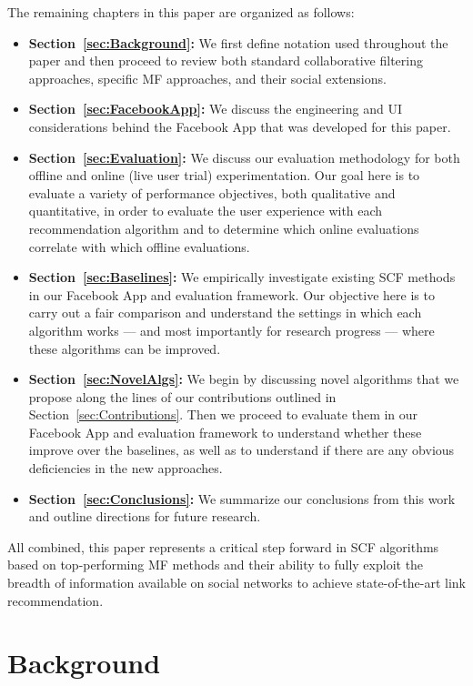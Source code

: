 \documentclass{sig-alternate}
\begin{document}
The remaining chapters in this paper are organized as follows:
\begin{itemize}
\item {\bf Section~\ref{sec:Background}:} We first define notation
used throughout the paper and then proceed to review both standard
collaborative filtering approaches, specific MF approaches, and
their social extensions.
\item {\bf Section~\ref{sec:FacebookApp}:} We discuss the engineering
and UI considerations behind the Facebook App that was developed for this
paper.
\item {\bf Section~\ref{sec:Evaluation}:} We discuss our evaluation
methodology for both offline and online (live user trial) experimentation.
Our goal here is to evaluate a variety of performance objectives,
both qualitative and quantitative, in order to evaluate the user
experience with each recommendation algorithm and to determine
which online evaluations correlate with which offline evaluations.
\item {\bf Section~\ref{sec:Baselines}:} We empirically investigate 
existing SCF methods in our Facebook App and evaluation framework.
Our objective here is to carry out a fair comparison and understand
the settings in which each algorithm works --- and most importantly
for research progress --- where these algorithms can be improved.
\item {\bf Section~\ref{sec:NovelAlgs}:} We begin by discussing novel
algorithms that we propose along the lines of our contributions
outlined in Section~\ref{sec:Contributions}.  Then we proceed to evaluate
them in our Facebook App and evaluation framework to understand
whether these improve over the baselines, as well as to understand
if there are any obvious deficiencies in the new approaches.
\item {\bf Section~\ref{sec:Conclusions}:} We summarize our conclusions
from this work and outline directions for future research.
\end{itemize}

All combined, this paper represents a critical step forward in SCF
algorithms based on top-performing MF methods and their ability to
fully exploit the breadth of information available on social networks
to achieve state-of-the-art link recommendation.

\section{Background}
\end{document}
